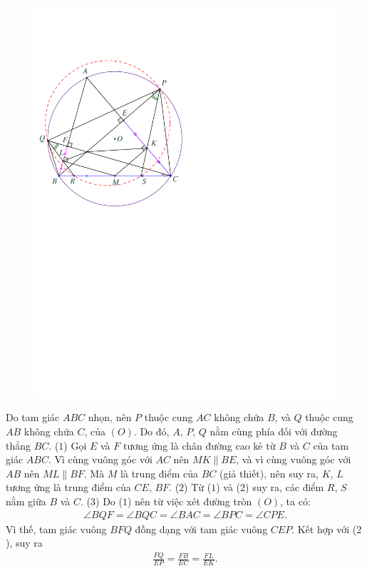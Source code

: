 \begin{multicols}{2}
\begin{figure}[H]
		\includegraphics[width=0.82\linewidth]{P624}
		\vspace*{-5pt}
	\end{figure}
	Do tam giác $ABC$ nhọn, nên $P$ thuộc cung $AC$ không chứa $B$, và $Q$ thuộc cung $AB$ không chứa $C$, của $(O)$. Do đó, $A$, $P$, $Q$ nằm cùng phía đối với đường thẳng $BC$. \hfill ($1$)
	\vskip 0.05cm
	Gọi $E$ và $F$ tương ứng là chân đường cao kẻ từ $B$ và $C$ của tam giác $ABC$.
	\vskip 0.05cm
	Vì cùng vuông góc với $AC$ nên $MK \parallel BE$, và vì cùng vuông góc với $AB$ nên $ML \parallel BF$. Mà $M$ là trung điểm của $BC$ (giả thiết), nên suy ra, $K$, $L$ tương ứng là trung điểm của \linebreak$CE$, $BF$. \hfill ($2$)
	\vskip 0.05cm
	Từ ($1$) và ($2$) suy ra, các điểm $R$, $S$ nằm giữa $B$ và $C$. \hfill ($3$)
	\vskip 0.05cm
	Do ($1$) nên từ việc xét đường tròn $(O)$, ta có:
	\begin{align*}
		\angle BQF \!=\! \angle BQC \!=\! \angle BAC \!=\! \angle BPC\! =\! \angle CPE.
	\end{align*}
	Vì thế, tam giác vuông $BFQ$ đồng dạng với tam giác vuông $CEP$. Kết hợp với ($2$), suy ra
	\begin{align*}
		\frac{{FQ}}{{EP}} = \frac{{FB}}{{EC}} = \frac{{FL}}{{EK}}.
	\end{align*}

\end{multicols}
